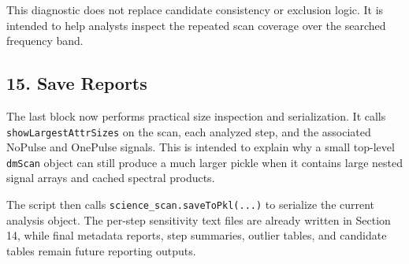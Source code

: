 \documentclass[11pt]{article}
\newcommand{\code}[1]{\texttt{#1}}
\begin{document}
This diagnostic does not replace candidate consistency or exclusion logic. It
is intended to help analysts inspect the repeated scan coverage over the
searched frequency band.

\subsection{15. Save Reports}

The last block now performs practical size inspection and serialization. It
calls \code{showLargestAttrSizes} on the scan, each analyzed step, and the
associated NoPulse and OnePulse signals. This is intended to explain why a
small top-level \code{dmScan} object can still produce a much larger pickle
when it contains large nested signal arrays and cached spectral products.

The script then calls \code{science\_scan.saveToPkl(...)} to serialize the
current analysis object. The per-step sensitivity text files are already
written in Section 14, while final metadata reports, step summaries, outlier
tables, and candidate tables remain future reporting outputs.
\end{document}
